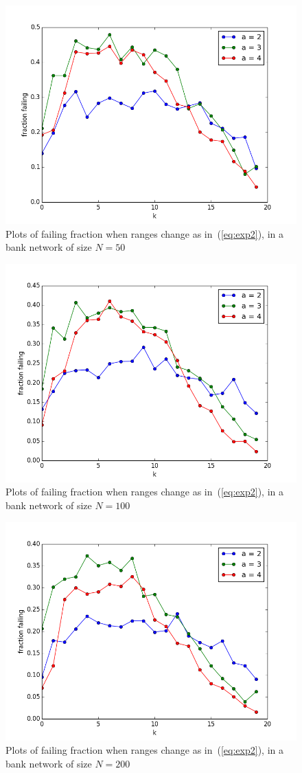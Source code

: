 \documentclass[a4paper, 11pt]{article}
\begin{document}
\begin{figure}[htbp]
    \centering
	\includegraphics[width=.8\textwidth]{images/ff50-2.png}
	\caption{Plots of failing fraction when ranges change as in~(\ref{eq:exp2}), in a bank network of size $N=50$}\label{fig:exp1}
\end{figure}
\begin{figure}[htbp]
    \centering
	\includegraphics[width=.8\textwidth]{images/ff100-2.png}
	\caption{Plots of failing fraction when ranges change as in~(\ref{eq:exp2}), in a bank network of size $N=100$}\label{fig:exp2}
\end{figure}
\begin{figure}[htbp]
    \centering
	\includegraphics[width=.8\textwidth]{images/ff200-2.png}
	\caption{Plots of failing fraction when ranges change as in~(\ref{eq:exp2}), in a bank network of size $N=200$}\label{fig:exp3}
\end{figure}
\end{document}

